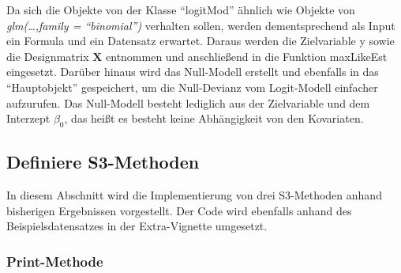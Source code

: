 \documentclass[12pt,]{article}
\begin{document}
Da sich die Objekte von der Klasse ``logitMod'' ähnlich wie Objekte von
\emph{glm(\ldots{},family = ``binomial'')} verhalten sollen, werden
dementsprechend als Input ein Formula und ein Datensatz erwartet. Daraus
werden die Zielvariable y sowie die Designmatrix \(\mathbf{X}\)
entnommen und anschließend in die Funktion maxLikeEst eingesetzt.
Darüber hinaus wird das Null-Modell erstellt und ebenfalls in das
``Hauptobjekt'' gespeichert, um die Null-Devianz vom Logit-Modell
einfacher aufzurufen. Das Null-Modell besteht lediglich aus der
Zielvariable und dem Interzept \(\beta_0\), das heißt es besteht keine
Abhängigkeit von den Kovariaten.

\subsection{Definiere S3-Methoden}\label{definiere-s3-methoden}

In diesem Abschnitt wird die Implementierung von drei S3-Methoden anhand
bisherigen Ergebnissen vorgestellt. Der Code wird ebenfalls anhand des
Beispielsdatensatzes in der Extra-Vignette umgesetzt.

\subsubsection{Print-Methode}\label{print-methode}
\end{document}
